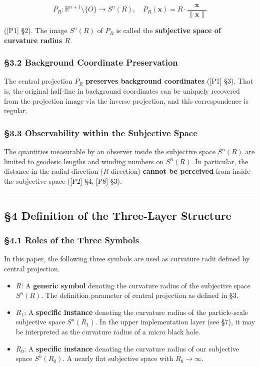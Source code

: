 \documentclass[
  a4paper,11pt]{article}
\providecommand{\tightlist}{%
  \setlength{\itemsep}{0pt}\setlength{\parskip}{0pt}}
\begin{document}
\[
P_R : \mathbb{R}^{n+1} \setminus \{O\} \to S^n(R), \quad P_R(\mathbf{x}) = R \cdot \frac{\mathbf{x}}{\|\mathbf{x}\|}
\]

({[}P1{]} §2). The image \(S^n(R)\) of \(P_R\) is called the
\textbf{subjective space of curvature radius \(R\)}.

\subsubsection{§3.2 Background Coordinate
Preservation}\label{background-coordinate-preservation}

The central projection \(P_R\) \textbf{preserves background coordinates}
({[}P1{]} §3). That is, the original half-line in background coordinates
can be uniquely recovered from the projection image via the inverse
projection, and this correspondence is regular.

\subsubsection{§3.3 Observability within the Subjective
Space}\label{observability-within-the-subjective-space}

The quantities measurable by an observer inside the subjective space
\(S^n(R)\) are limited to geodesic lengths and winding numbers on
\(S^n(R)\). In particular, the distance in the radial direction
(\(R\)-direction) \textbf{cannot be perceived} from inside the
subjective space ({[}P2{]} §4, {[}P8{]} §3).

\begin{center}\rule{0.5\linewidth}{0.5pt}\end{center}

\subsection{§4 Definition of the Three-Layer
Structure}\label{definition-of-the-three-layer-structure}

\subsubsection{§4.1 Roles of the Three
Symbols}\label{roles-of-the-three-symbols}

In this paper, the following three symbols are used as curvature radii
defined by central projection.

\begin{itemize}
\tightlist
\item
  \(R\): A \textbf{generic symbol} denoting the curvature radius of the
  subjective space \(S^n(R)\). The definition parameter of central
  projection as defined in §3.
\item
  \(R_1\): A \textbf{specific instance} denoting the curvature radius of
  the particle-scale subjective space \(S^n(R_1)\). In the upper
  implementation layer (see §7), it may be interpreted as the curvature
  radius of a micro black hole.
\item
  \(R_0\): A \textbf{specific instance} denoting the curvature radius of
  our subjective space \(S^n(R_0)\). A nearly flat subjective space with
  \(R_0 \to \infty\).
\end{itemize}
\end{document}
